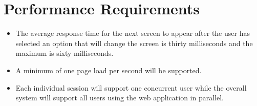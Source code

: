 \section{Performance Requirements}
\begin{itemize}
\item The average response time for the next screen to appear after the user has selected an option that will change the screen is thirty milliseconds and the maximum is sixty milliseconds.
\item A minimum of one page load per second will be supported.
\item Each individual session will support one concurrent user while the overall system will support all users using the web application in parallel.
\end{itemize}
